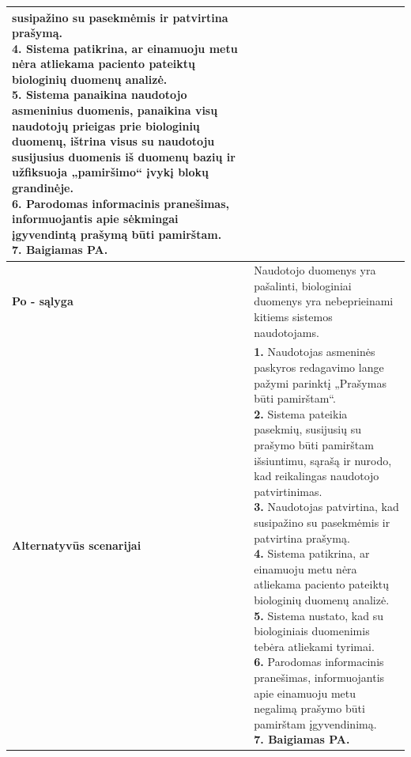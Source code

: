 \documentclass[12pt]{article}
\begin{document}
\begin{table}[htb!]
\begin{tabular}{|m{3cm}|m{13.7cm}|}
{{{            susipažino su pasekmėmis ir patvirtina prašymą.} \\
            \textbf{4.} {Sistema patikrina, ar
            einamuoju metu nėra atliekama paciento pateiktų biologinių duomenų
            analizė.} \\
            \textbf{5.} {Sistema panaikina naudotojo
            asmeninius duomenis, panaikina visų naudotojų prieigas prie
            biologinių duomenų, ištrina visus su naudotoju susijusius duomenis
            iš duomenų bazių ir užfiksuoja „pamiršimo“ įvykį blokų
            grandinėje.} \\
            \textbf{6.} {Parodomas informacinis
            pranešimas, informuojantis apie sėkmingai įgyvendintą prašymą būti
            pamirštam.} \\
            \textbf{7. Baigiamas PA.}
        }}
        \\
        \hline
        \raggedleft \textbf{\cellcolor{deepchampagne}Po - sąlyga} &
        Naudotojo duomenys yra pašalinti, biologiniai duomenys yra nebeprieinami
        kitiems sistemos naudotojams. \\
        \hline
        \raggedleft \textbf{\cellcolor{deepchampagne}Alternatyvūs scenarijai} &
        \vskip 5pt
        \makecell[l]{\parbox[t]{13.7cm}{
            \textbf{1.} \textcolor{dartmouthgreen}{Naudotojas asmeninės paskyros
            redagavimo lange pažymi parinktį „Prašymas būti pamirštam“.} \\
            \textbf{2.} {Sistema pateikia pasekmių,
            susijusių su prašymo būti pamirštam išsiuntimu, sąrašą ir
            nurodo, kad reikalingas naudotojo patvirtinimas.} \\
            \textbf{3.} \textcolor{dartmouthgreen}{Naudotojas patvirtina, kad
            susipažino su pasekmėmis ir patvirtina prašymą.} \\
            \textbf{4.} {Sistema patikrina, ar
            einamuoju metu nėra atliekama paciento pateiktų biologinių duomenų
            analizė.} \\
            \textbf{5.} {Sistema nustato, kad su
            biologiniais duomenimis tebėra atliekami tyrimai.} \\
            \textbf{6.} {Parodomas informacinis
            pranešimas, informuojantis apie einamuoju metu negalimą prašymo
            būti pamirštam įgyvendinimą.} \\
            \textbf{7. Baigiamas PA.}
        }}
        \\
        \hline
    \end{tabular}
\end{table}
\end{document}

